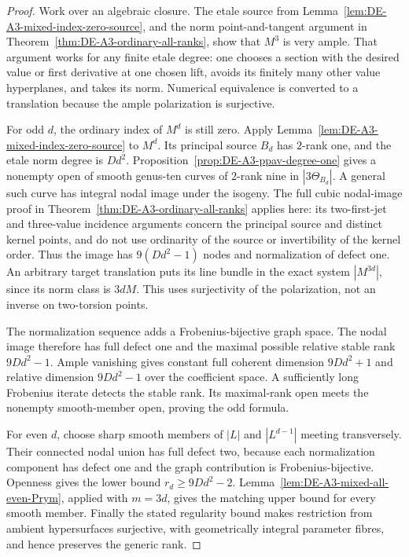 \begin{proof}
Work over an algebraic closure.  The etale source from
Lemma~\ref{lem:DE-A3-mixed-index-zero-source}, and the norm
point-and-tangent argument in
Theorem~\ref{thm:DE-A3-ordinary-all-ranks}, show that $M^3$ is
very ample.  That argument works for any finite etale degree:
one chooses a section with the desired value or first derivative
at one chosen lift, avoids its finitely many other value hyperplanes,
and takes its norm.  Numerical equivalence is converted to a
translation because the ample polarization is surjective.

For odd $d$, the ordinary index of $M^d$ is still zero.
Apply Lemma~\ref{lem:DE-A3-mixed-index-zero-source} to $M^d$.
Its principal source $B_d$ has $2$-rank one, and the etale norm
degree is $Dd^2$.  Proposition~\ref{prop:DE-A3-ppav-degree-one}
gives a nonempty open of smooth genus-ten curves of $2$-rank nine
in $|3\Theta_{B_d}|$.
A general such curve has integral nodal image under the isogeny.
The full cubic nodal-image proof in
Theorem~\ref{thm:DE-A3-ordinary-all-ranks} applies here:
its two-first-jet and three-value incidence arguments concern
the principal source and distinct kernel points, and do not use
ordinarity of the source or invertibility of the kernel order.
Thus the image has $9(Dd^2-1)$ nodes and normalization of defect one.
An arbitrary target translation puts its line bundle in the exact
system $|M^{3d}|$, since its norm class is $3dM$.
This uses surjectivity of the polarization, not an inverse on
two-torsion points.

The normalization sequence adds a Frobenius-bijective graph space.
The nodal image therefore has full defect one and the maximal
possible relative stable rank $9Dd^2-1$.
Ample vanishing gives constant full coherent dimension
$9Dd^2+1$ and relative dimension $9Dd^2-1$ over the coefficient
space.  A sufficiently long Frobenius iterate detects the stable
rank.  Its maximal-rank open meets the nonempty smooth-member open,
proving the odd formula.

For even $d$, choose sharp smooth members of $|L|$ and
$|L^{d-1}|$ meeting transversely.  Their connected nodal union
has full defect two, because each normalization component has
defect one and the graph contribution is Frobenius-bijective.
Openness gives the lower bound $r_d\ge9Dd^2-2$.
Lemma~\ref{lem:DE-A3-mixed-all-even-Prym}, applied with $m=3d$,
gives the matching upper bound for every smooth member.
Finally the stated regularity bound makes restriction from ambient
hypersurfaces surjective, with geometrically integral parameter
fibres, and hence preserves the generic rank.
\end{proof}

